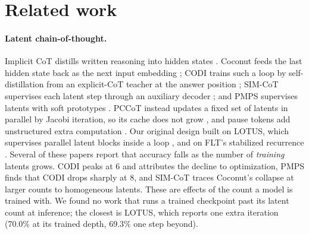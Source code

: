 \documentclass[11pt]{article}
\begin{document}
\section{Related work}
\label{sec:related}

\paragraph{Latent chain-of-thought.} Implicit CoT distills written reasoning into hidden states \citep{deng2023implicit}.
Coconut feeds the last hidden state back as the next input embedding \citep{hao2025coconut}; CODI trains such a loop by
self-distillation from an explicit-CoT teacher at the answer position \citep{shen2025codi}; SIM-CoT supervises each latent
step through an auxiliary decoder \citep{wei2025simcot}; and PMPS supervises latents with soft prototypes
\citep{li2026pmps}. PCCoT instead updates a fixed set of latents in parallel by Jacobi iteration, so its cache does not grow
\citep{wu2025pccot}, and pause tokens add unstructured extra computation \citep{goyal2024pause}. Our original design built on
LOTUS, which supervises parallel latent blocks inside a loop \citep{fan2026lotus}, and on FLT's stabilized recurrence
\citep{fu2026flt}. Several of these papers report that accuracy falls as the number of \emph{training} latents grows. CODI
peaks at 6 and attributes the decline to optimization, PMPS finds that CODI drops sharply at 8, and SIM-CoT traces Coconut's
collapse at larger counts to homogeneous latents. These are effects of the count a model is trained with. We found no work
that runs a trained checkpoint past its latent count at inference; the closest is LOTUS, which reports one extra iteration
(70.0\% at its trained depth, 69.3\% one step beyond).
\end{document}

